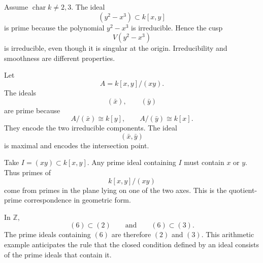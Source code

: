 \begin{example}
Assume \(\operatorname{char}k\neq2,3\).  The ideal
\[
(y^2-x^3)\subset k[x,y]
\]
is prime because the polynomial \(y^2-x^3\) is irreducible.  Hence the cusp
\[
V(y^2-x^3)
\]
is irreducible, even though it is singular at the origin.  Irreducibility and smoothness
are different properties.
\end{example}

\begin{example}
Let
\[
A=k[x,y]/(xy).
\]
The ideals
\[
(\bar x),\qquad(\bar y)
\]
are prime because
\[
A/(\bar x)\cong k[y],
\qquad
A/(\bar y)\cong k[x].
\]
They encode the two irreducible components.  The ideal
\[
(\bar x,\bar y)
\]
is maximal and encodes the intersection point.
\end{example}

\begin{example}
Take \(I=(xy)\subset k[x,y]\).  Any prime ideal containing \(I\) must contain \(x\) or
\(y\).  Thus primes of
\[
k[x,y]/(xy)
\]
come from primes in the plane lying on one of the two axes.  This is the quotient-prime
correspondence in geometric form.
\end{example}

\begin{example}
In \(\mathbb Z\),
\[
(6)\subset(2)
\qquad\text{and}\qquad
(6)\subset(3).
\]
The prime ideals containing \((6)\) are therefore \((2)\) and \((3)\).  This arithmetic
example anticipates the rule that the closed condition defined by an ideal consists of the
prime ideals that contain it.
\end{example}
